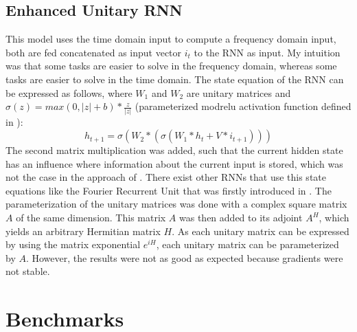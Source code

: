 \documentclass[draft,final]{vutinfth} %
\begin{document}
    \subsection{Enhanced Unitary RNN} \label{Enhanced Unitary RNN}
    This model uses the time domain input to compute a frequency domain input, both are fed concatenated as input vector $i_t$ to the RNN as input.
    My intuition was that some tasks are easier to solve in the frequency domain, whereas some tasks are easier to solve in the time domain.
    The state equation of the RNN can be expressed as follows, where $W_1$ and $W_2$ are unitary matrices and $\sigma(z) = max(0,|z|+b)*\frac{z}{|z|}$ (parameterized modrelu activation function defined in \cite{UnitaryRNNs}):
    \begin{equation}
        h_{t+1} = \sigma(W_2 * (\sigma(W_1 * h_t + V * i_{t+1})))
    \end{equation}
    The second matrix multiplication was added, such that the current hidden state has an influence where information about the current input is stored, which was not the case in the approach of \cite{UnitaryRNNs}.
    There exist other RNNs that use this state equations like the Fourier Recurrent Unit that was firstly introduced in \cite{FRU}.
    The parameterization of the unitary matrices was done with a complex square matrix $A$ of the same dimension.
    This matrix $A$ was then added to its adjoint $A^H$, which yields an arbitrary Hermitian matrix $H$.
    As each unitary matrix can be expressed by using the matrix exponential $e^{iH}$, each unitary matrix can be parameterized by $A$.
    However, the results were not as good as expected because gradients were not stable.


    \section{Benchmarks}
\end{document}
